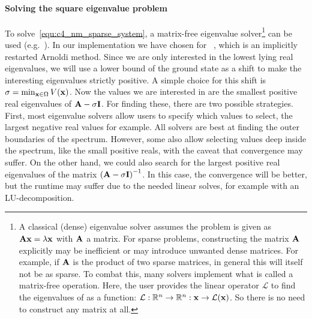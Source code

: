 
\paragraph{Solving the square eigenvalue problem}
To solve~\eqref{equ:c4_nm_sparse_system}, a matrix-free eigenvalue solver\footnote{A classical (dense) eigenvalue solver assumes the problem is given as $\vb{A} \vb{x} = \lambda \vb{x}$ with $\vb{A}$ a matrix. For sparse problems, constructing the matrix $\vb{A}$ explicitly may be inefficient or may introduce unwanted dense matrices. For example, if $\vb{A}$ is the product of two sparse matrices, in general this will itself not be as sparse. To combat this, many solvers implement what is called a matrix-free operation. Here, the user provides the linear operator $\mathcal{L}$ to find the eigenvalues of as a function: $\mathcal{L} : \mathbb{R}^n \to \mathbb{R}^n : \vb{x} \to \mathcal{L}(\vb{x})$. So there is no need to construct any matrix at all.} can be used (e.g.~\cite{lehoucq_arpack_1998,hernandez_slepc_2005,qiu_spectra_2022}). In our implementation we have chosen for \spectra{}~\cite{qiu_spectra_2022}, which is an implicitly restarted Arnoldi method. Since we are only interested in the lowest lying real eigenvalues, we will use a lower bound of the ground state as a shift to make the interesting eigenvalues strictly positive. A simple choice for this shift is $\sigma = \min_{\vb{x} \in \Omega} V(\vb{x})$. Now the values we are interested in are the smallest positive real eigenvalues of $\vb{A} - \sigma \vb{I}$. For finding these, there are two possible strategies. First, most eigenvalue solvers allow users to specify which values to select, the largest negative real values for example. All solvers are best at finding the outer boundaries of the spectrum. However, some also allow selecting values deep inside the spectrum, like the small positive reals, with the caveat that convergence may suffer. On the other hand, we could also search for the largest positive real eigenvalues of the matrix $\left(\vb{A} - \sigma \vb{I}\right)^{-1}$. In this case, the convergence will be better, but the runtime may suffer due to the needed linear solves, for example with an LU-decomposition.

